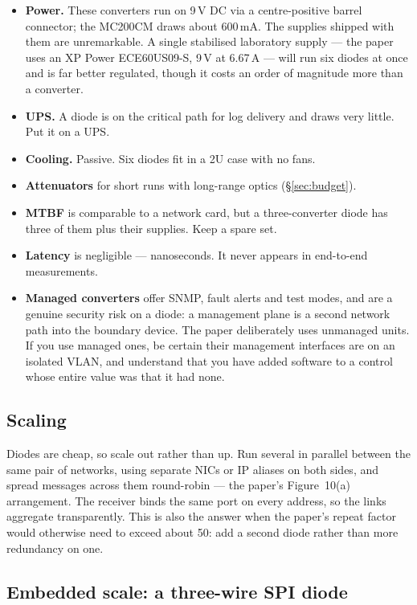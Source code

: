 \documentclass[11pt,a4paper]{article}
\begin{document}
\begin{itemize}
\item \textbf{Power.} These converters run on 9\,V DC via a
      centre-positive barrel connector; the MC200CM draws about 600\,mA. The
      supplies shipped with them are unremarkable. A single stabilised
      laboratory supply --- the paper uses an XP Power ECE60US09-S, 9\,V at
      6.67\,A --- will run six diodes at once and is far better regulated,
      though it costs an order of magnitude more than a converter.
\item \textbf{UPS.} A diode is on the critical path for log delivery and
      draws very little. Put it on a UPS.
\item \textbf{Cooling.} Passive. Six diodes fit in a 2U case with no fans.
\item \textbf{Attenuators} for short runs with long-range optics
      (\S\ref{sec:budget}).
\item \textbf{MTBF} is comparable to a network card, but a three-converter
      diode has three of them plus their supplies. Keep a spare set.
\item \textbf{Latency} is negligible --- nanoseconds. It never appears in
      end-to-end measurements.
\item \textbf{Managed converters} offer SNMP, fault alerts and test modes, and
      are a genuine security risk on a diode: a management plane is a second
      network path into the boundary device. The paper deliberately uses
      unmanaged units. If you use managed ones, be certain their management
      interfaces are on an isolated VLAN, and understand that you have added
      software to a control whose entire value was that it had none.
\end{itemize}

\subsection{Scaling}

Diodes are cheap, so scale out rather than up. Run several in parallel
between the same pair of networks, using separate NICs or IP aliases on both
sides, and spread messages across them round-robin --- the paper's
Figure~10(a) arrangement. The receiver binds the same port on every address,
so the links aggregate transparently. This is also the answer when the paper's
repeat factor would otherwise need to exceed about 50: add a second diode
rather than more redundancy on one.

\subsection{Embedded scale: a three-wire SPI diode}
\label{sec:spi}
\end{document}
